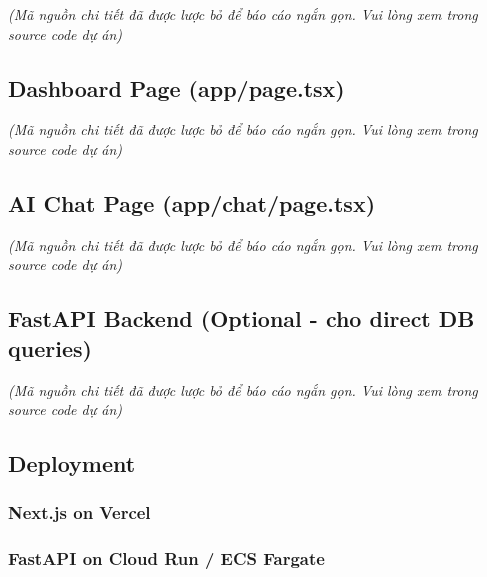 \emph{(Mã nguồn chi tiết đã được lược bỏ để báo cáo ngắn gọn. Vui lòng
xem trong source code dự án)}

\hypertarget{dashboard-page-apppage.tsx}{%
\subsection{Dashboard Page
(app/page.tsx)}}

\emph{(Mã nguồn chi tiết đã được lược bỏ để báo cáo ngắn gọn. Vui lòng
xem trong source code dự án)}

\hypertarget{ai-chat-page-appchatpage.tsx}{%
\subsection{AI Chat Page
(app/chat/page.tsx)}}

\emph{(Mã nguồn chi tiết đã được lược bỏ để báo cáo ngắn gọn. Vui lòng
xem trong source code dự án)}

\hypertarget{fastapi-backend-optional---cho-direct-db-queries}{%
\subsection{FastAPI Backend (Optional - cho direct DB
queries)}}

\emph{(Mã nguồn chi tiết đã được lược bỏ để báo cáo ngắn gọn. Vui lòng
xem trong source code dự án)}

\hypertarget{deployment}{%
\subsection{Deployment}}

\hypertarget{next.js-on-vercel}{%
\subsubsection{Next.js on Vercel}}

\begin{Shaded}
\begin{Highlighting}[]
\end{Highlighting}
\end{Shaded}

\hypertarget{fastapi-on-cloud-run-ecs-fargate}{%
\subsubsection{FastAPI on Cloud Run / ECS
Fargate}}


